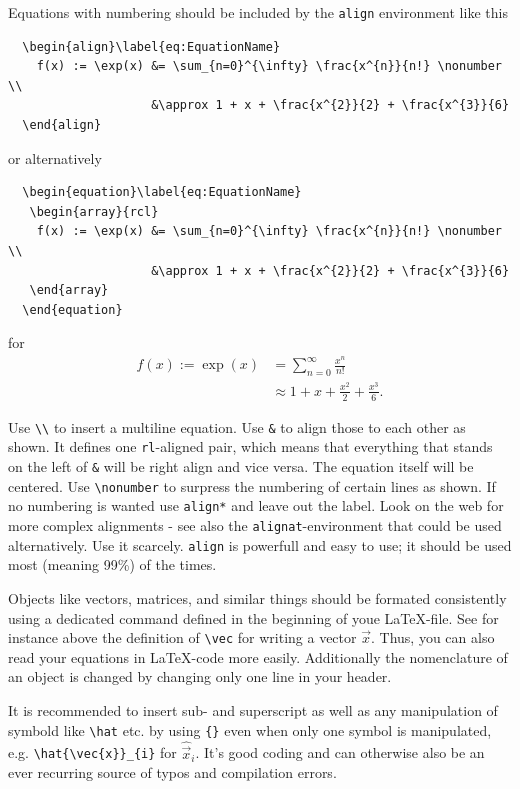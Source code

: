 Equations with numbering should be included by the \verb!align! environment
like this
\begin{verbatim}
  \begin{align}\label{eq:EquationName}
    f(x) := \exp(x) &= \sum_{n=0}^{\infty} \frac{x^{n}}{n!} \nonumber \\
                    &\approx 1 + x + \frac{x^{2}}{2} + \frac{x^{3}}{6}
  \end{align}
\end{verbatim}
  or alternatively
\begin{verbatim}
  \begin{equation}\label{eq:EquationName}
   \begin{array}{rcl}
    f(x) := \exp(x) &= \sum_{n=0}^{\infty} \frac{x^{n}}{n!} \nonumber \\
                    &\approx 1 + x + \frac{x^{2}}{2} + \frac{x^{3}}{6}
   \end{array}
  \end{equation}
\end{verbatim}
for
~
\begin{align}\label{eq:EquationName}
  f(x) := \exp(x) &= \sum_{n=0}^{\infty} \frac{x^{n}}{n!} \nonumber \\
                  &\approx 1 + x + \frac{x^{2}}{2} + \frac{x^{3}}{6}.
\end{align}

Use \verb!\\! to insert a multiline equation. Use \verb!&! to align those 
to each other as shown. It defines one \verb!rl!-aligned pair, which means that
everything that stands on the left of \verb!&! will be right align and vice
versa.  The equation itself will be centered. Use \verb!\nonumber! to surpress
the numbering of certain lines as shown. If no numbering is wanted use
\verb!align*! and leave out the label. Look on the web for more complex
alignments - see also the \verb!alignat!-environment that could be used
alternatively. Use it scarcely. \verb!align! is powerfull and easy to use; it
should be used most (meaning 99\%) of the times.

Objects like vectors, matrices, and similar things should be formated
consistently using a dedicated command defined in the beginning of youe
\LaTeX-file. See for instance above the definition of \verb!\vec! for writing
a vector $\vec{x}$. Thus, you can also read your equations in \LaTeX-code more
easily. Additionally the nomenclature of an object is changed by
changing only one line in your header. 

It is recommended to insert sub- and superscript as well as any manipulation of
symbold like \verb!\hat! etc. by using \verb!{}! even when only one symbol is
manipulated, e.g. \verb!\hat{\vec{x}}_{i}! for $\hat{\vec{x}}_{i}$. It's good
coding and can otherwise also be an ever recurring source of typos and
compilation errors.
